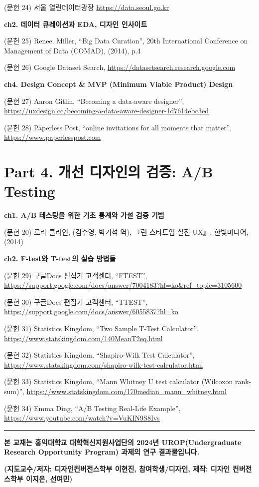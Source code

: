 \documentclass[
  letterpaper,
]{book}
\begin{document}
(문헌 24) 서울 열린데이터광장 \url{https://data.seoul.go.kr}

\textbf{ch2. 데이터 큐레이션과 EDA, 디자인 인사이트}

(문헌 25) Renee. Miller, ``Big Data Curation'', 20th International
Conference on Management of Data (COMAD), (2014), p.4

(문헌 26) Google Dataset Search,
\url{https://datasetsearch.research.google.com}

\textbf{ch4. Design Concept \& MVP (Minimum Viable Product) Design}

(문헌 27) Aaron Gitlin, ``Becoming a data-aware designer'',
\url{https://uxdesign.cc/becoming-a-data-aware-designer-1d7614ebc3ed}

(문헌 28) Paperless Post, ``online invitations for all moments that
matter'', \url{https://www.paperlesspost.com}

\section*{Part 4. 개선 디자인의 검증: A/B
Testing}\label{part-4.-uxac1cuxc120-uxb514uxc790uxc778uxc758-uxac80uxc99d-ab-testing-2}


\textbf{ch1. A/B 테스팅을 위한 기초 통계와 가설 검증 기법}

(문헌 20) 로라 클라인, (김수영, 박기석 역), 『린 스타트업 실전 UX』,
한빛미디어,(2014)

\textbf{ch2. F-test와 T-test의 실습 방법들}

(문헌 29) 구글Docs 편집기 고객센터, ``FTEST'',
\url{https://support.google.com/docs/answer/7004183?hl=ko&ref_topic=3105600}

(문헌 30) 구글Docs 편집기 고객센터, ``TTEST'',
\url{https://support.google.com/docs/answer/6055837?hl=ko}

(문헌 31) Statistics Kingdom, ``Two Sample T-Test Calculator'',
\url{https://www.statskingdom.com/140MeanT2eq.html}

(문헌 32) Statistics Kingdom, ``Shapiro-Wilk Test Calculator'',
\url{https://www.statskingdom.com/shapiro-wilk-test-calculator.html}

(문헌 33) Statistics Kingdom, ``Mann Whitney U test calculator (Wilcoxon
rank-sum)'',
\url{https://www.statskingdom.com/170median_mann_whitney.html}

(문헌 34) Emma Ding, ``A/B Testing Real-Life Example'',
\url{https://www.youtube.com/watch?v=VuKIN9S8Ivs}

\begin{center}\rule{0.5\linewidth}{0.5pt}\end{center}

\textbf{본 교재는 홍익대학교 대학혁신지원사업단의 2024년
UROP(Undergraduate Research Opportunity Program) 과제의 연구
결과물입니다.}

\textbf{(지도교수/저자: 디자인컨버전스학부 이현진, 참여학생/디자인,
제작: 디자인 컨버전스학부 이지은, 선여민)}


\backmatter
\printbibliography


\printindex
\end{document}

